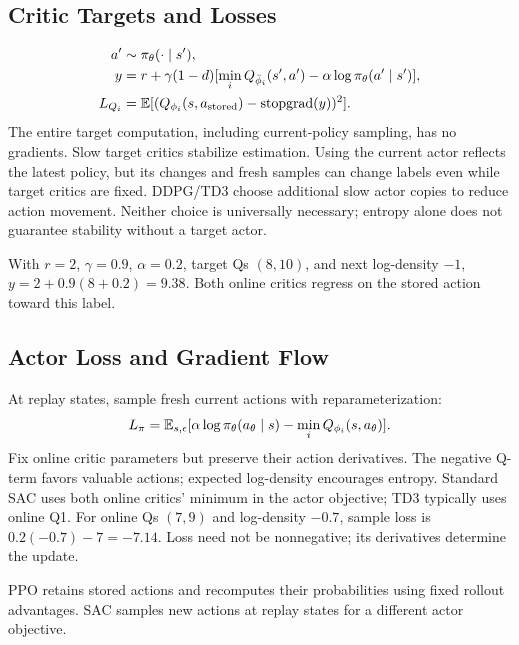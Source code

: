 \subsection{Critic Targets and Losses}
\begin{align}
a'&\sim\pi_\theta(\cdot\mid s'),\\
y&=r+\gamma(1-d)
[\min_iQ_{\bar\phi_i}(s',a')-\alpha\log\pi_\theta(a'\mid s')],\\
L_{Q_i}&=\mathbb{E}[(Q_{\phi_i}(s,a_{\rm stored})
-\operatorname{stopgrad}(y))^2].
\end{align}
The entire target computation, including current-policy sampling,
has no gradients. Slow target critics stabilize estimation.
Using the current actor reflects the latest policy, but its changes
and fresh samples can change labels even while target critics are fixed.
DDPG/TD3 choose additional slow actor copies to reduce action movement.
Neither choice is universally necessary; entropy alone does not
guarantee stability without a target actor.

With $r=2$, $\gamma=0.9$, $\alpha=0.2$, target Qs $(8,10)$,
and next log-density $-1$, $y=2+0.9(8+0.2)=9.38$.
Both online critics regress on the stored action toward this label.

\subsection{Actor Loss and Gradient Flow}
At replay states, sample fresh current actions with reparameterization:
\begin{equation}
L_\pi=\mathbb{E}_{s,\epsilon}
[\alpha\log\pi_\theta(a_\theta\mid s)
-\min_iQ_{\phi_i}(s,a_\theta)].
\end{equation}
Fix online critic parameters but preserve their action derivatives.
The negative Q-term favors valuable actions; expected log-density
encourages entropy. Standard SAC uses both online critics' minimum
in the actor objective; TD3 typically uses online Q1.
For online Qs $(7,9)$ and log-density $-0.7$, sample loss is
$0.2(-0.7)-7=-7.14$. Loss need not be nonnegative;
its derivatives determine the update.

PPO retains stored actions and recomputes their probabilities using
fixed rollout advantages. SAC samples new actions at replay states
for a different actor objective.

